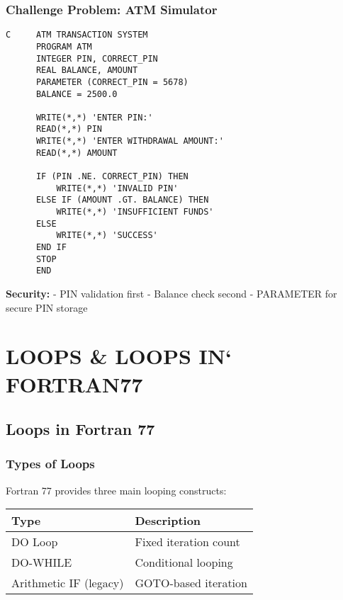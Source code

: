 \documentclass{book}
\begin{document}
\subsection*{Challenge Problem: ATM Simulator}
\begin{verbatim}
C     ATM TRANSACTION SYSTEM
      PROGRAM ATM
      INTEGER PIN, CORRECT_PIN
      REAL BALANCE, AMOUNT
      PARAMETER (CORRECT_PIN = 5678)
      BALANCE = 2500.0
      
      WRITE(*,*) 'ENTER PIN:'
      READ(*,*) PIN
      WRITE(*,*) 'ENTER WITHDRAWAL AMOUNT:'
      READ(*,*) AMOUNT
      
      IF (PIN .NE. CORRECT_PIN) THEN
          WRITE(*,*) 'INVALID PIN'
      ELSE IF (AMOUNT .GT. BALANCE) THEN
          WRITE(*,*) 'INSUFFICIENT FUNDS'
      ELSE
          WRITE(*,*) 'SUCCESS'
      END IF
      STOP
      END
\end{verbatim}
\textbf{Security:}
- PIN validation first
- Balance check second
- PARAMETER for secure PIN storage

\chapter{LOOPS \& LOOPS IN` FORTRAN77}

\section{Loops in Fortran 77}

\subsection*{Types of Loops}
Fortran 77 provides three main looping constructs:
\begin{center}
\begin{tabular}{|l|l|}
\hline
\textbf{Type} & \textbf{Description} \\ 
\hline
DO Loop & Fixed iteration count \\
DO-WHILE & Conditional looping \\
Arithmetic IF (legacy) & GOTO-based iteration \\
\hline
\end{tabular}
\end{center}
\end{document}

